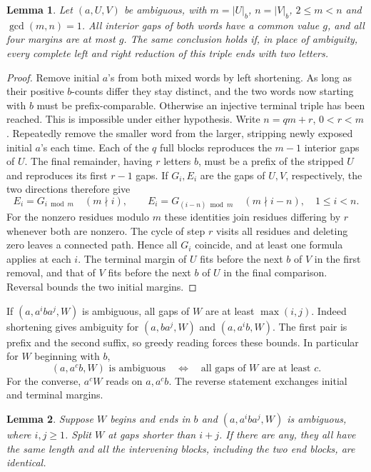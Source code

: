 \documentclass[11pt,a4paper]{article}
\newtheorem{lemma}{Lemma}
\newcommand{\bct}[1]{\lvert #1\rvert_b}
\begin{document}
\begin{lemma}\label{counts}
Let $(a,U,V)$ be ambiguous, with $m=\bct U$, $n=\bct V$, $2\le m<n$ and $\gcd(m,n)=1$. All interior gaps of both words have a common value $g$, and all four margins are at most $g$. The same conclusion holds if, in place of ambiguity, every complete left and right reduction of this triple ends with two letters.
\end{lemma}
\begin{proof}
Remove initial $a$'s from both mixed words by left shortening. As long as their positive $b$-counts differ they stay distinct, and the two words now starting with $b$ must be prefix-comparable. Otherwise an injective terminal triple has been reached. This is impossible under either hypothesis. Write $n=qm+r$, $0<r<m$. Repeatedly remove the smaller word from the larger, stripping newly exposed initial $a$'s each time. Each of the $q$ full blocks reproduces the $m-1$ interior gaps of $U$. The final remainder, having $r$ letters $b$, must be a prefix of the stripped $U$ and reproduces its first $r-1$ gaps. If $G_i,E_i$ are the gaps of $U,V$, respectively, the two directions therefore give
\[
 E_i=G_{i\bmod m}\quad(m\nmid i),\qquad
 E_i=G_{(i-n)\bmod m}\quad(m\nmid i-n),\quad 1\le i<n .
\]
For the nonzero residues modulo $m$ these identities join residues differing by $r$ whenever both are nonzero. The cycle of step $r$ visits all residues and deleting zero leaves a connected path. Hence all $G_i$ coincide, and at least one formula applies at each $i$. The terminal margin of $U$ fits before the next $b$ of $V$ in the first removal, and that of $V$ fits before the next $b$ of $U$ in the final comparison. Reversal bounds the two initial margins.
\end{proof}
If $(a,a^i b a^j,W)$ is ambiguous, all gaps of $W$ are at least $\max(i,j)$. Indeed shortening gives ambiguity for $(a,ba^j,W)$ and $(a,a^i b,W)$. The first pair is prefix and the second suffix, so greedy reading forces these bounds. In particular for $W$ beginning with $b$,
\begin{equation}\label{one}
 (a,a^c b,W)\text{ is ambiguous}\quad\Longleftrightarrow\quad
 \text{all gaps of }W\text{ are at least }c .
\end{equation}
For the converse, $a^cW$ reads on $a,a^c b$. The reverse statement exchanges initial and terminal margins.
\begin{lemma}\label{short}
Suppose $W$ begins and ends in $b$ and $(a,a^i b a^j,W)$ is ambiguous, where $i,j\ge1$. Split $W$ at gaps shorter than $i+j$. If there are any, they all have the same length and all the intervening blocks, including the two end blocks, are identical.
\end{lemma}
\end{document}
